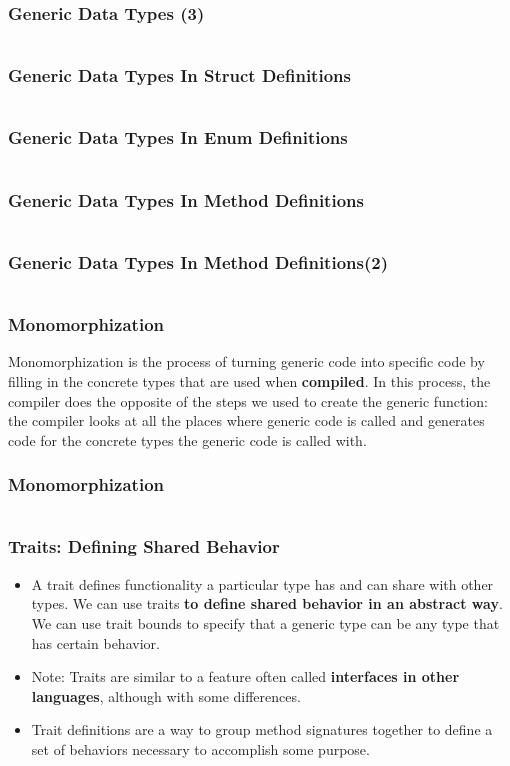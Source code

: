 \documentclass{beamer}
\begin{document}
\begin{frame}[fragile]
	\frametitle{Generic Data Types (3)}
		\inputminted[fontsize=\scriptsize]{rust}{./code/generic3.rs}
\end{frame}

\begin{frame}[fragile]
	\frametitle{Generic Data Types In Struct Definitions}
	\inputminted{rust}{./code/generic4.rs}
\end{frame}

\begin{frame}[fragile]
	\frametitle{Generic Data Types In Enum Definitions}
	\inputminted{rust}{./code/generic5.rs}
\end{frame}


\begin{frame}[fragile]
	\frametitle{Generic Data Types In Method Definitions}
	\inputminted[fontsize=\scriptsize]{rust}{./code/generic6.rs}
\end{frame}

\begin{frame}[fragile]
	\frametitle{Generic Data Types In Method Definitions(2)}
	\inputminted[fontsize=\scriptsize]{rust}{./code/generic7.rs}
\end{frame}


\begin{frame}[fragile]
	\frametitle{Monomorphization}
	 Monomorphization is the process of turning generic code into specific code by filling in the concrete types that are used when \textbf{compiled}. In this process, the compiler does the opposite of the steps we used to create the generic function: the compiler looks at all the places where generic code is called and generates code for the concrete types the generic code is called with.
	 
\end{frame}

\begin{frame}[fragile]
	\frametitle{Monomorphization}

	\inputminted[fontsize=\scriptsize]{rust}{./code/generic8.rs}
\end{frame}


\begin{frame}[fragile]
	\frametitle{Traits: Defining Shared Behavior}
	\begin{itemize}
		\item A trait defines functionality a particular type has and can share with other types. We can use traits \textbf{to define shared behavior in an abstract way}. We can use trait bounds to specify that a generic type can be any type that has certain behavior.
		\item 	Note: Traits are similar to a feature often called \textbf{interfaces in other languages}, although with some differences.
		\item 	Trait definitions are a way to group method signatures together to define a set of behaviors necessary to accomplish some purpose.
	\end{itemize}
\end{frame}
\end{document}
